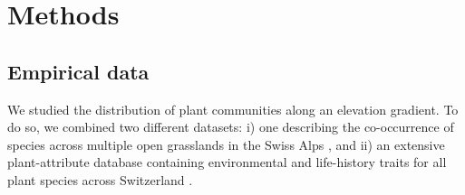 \documentclass[11pt, a4paper]{article}
\begin{document}


 
\section*{Methods}
\subsection*{Empirical data}
We studied the distribution of plant communities along an elevation gradient. To do so, we combined two different datasets: i) one describing the co-occurrence of species across multiple open grasslands in the Swiss Alps \citep{randinClimateChangePlant2009}, and ii) an extensive plant-attribute database containing environmental and life-history traits for all plant species across Switzerland \citep{landoltFloraIndicativaOkologische2010}. 
\end{document}
